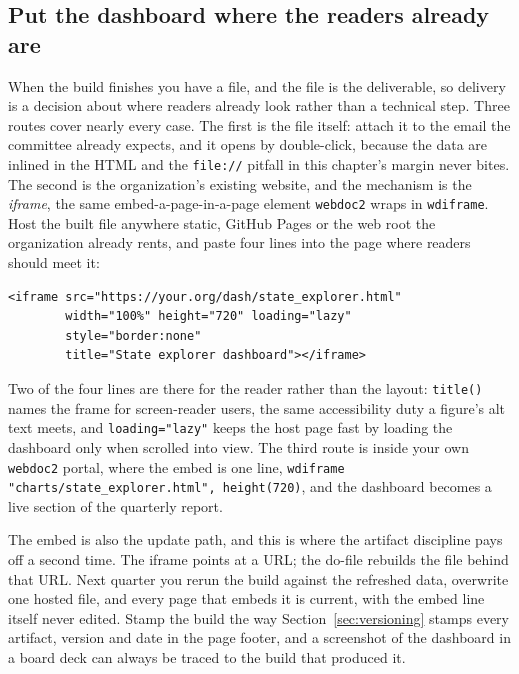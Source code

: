 \subsection{Put the dashboard where the readers already are}
When the build finishes you have a file, and the file is the deliverable, so delivery is a decision about where readers already look rather than a technical step. Three routes cover nearly every case. The first is the file itself: attach it to the email the committee already expects, and it opens by double-click, because the data are inlined in the HTML and the \texttt{file://} pitfall in this chapter's margin never bites. The second is the organization's existing website, and the mechanism is the \emph{iframe}, the same embed-a-page-in-a-page element \texttt{webdoc2} wraps in \texttt{wdiframe}. Host the built file anywhere static, GitHub Pages or the web root the organization already rents, and paste four lines into the page where readers should meet it:
\par
{\footnotesize
\begin{verbatim}
<iframe src="https://your.org/dash/state_explorer.html"
        width="100%" height="720" loading="lazy"
        style="border:none"
        title="State explorer dashboard"></iframe>
\end{verbatim}
}
Two of the four lines are there for the reader rather than the layout: \texttt{title()} names the frame for screen-reader users, the same accessibility duty a figure's alt text meets, and \texttt{loading="lazy"} keeps the host page fast by loading the dashboard only when scrolled into view. The third route is inside your own \texttt{webdoc2} portal, where the embed is one line, \texttt{wdiframe "charts/state\_explorer.html", height(720)}, and the dashboard becomes a live section of the quarterly report.

The embed is also the update path, and this is where the artifact discipline pays off a second time. The iframe points at a URL; the do-file rebuilds the file behind that URL. Next quarter you rerun the build against the refreshed data, overwrite one hosted file, and every page that embeds it is current, with the embed line itself never edited. Stamp the build the way Section~\ref{sec:versioning} stamps every artifact, version and date in the page footer, and a screenshot of the dashboard in a board deck can always be traced to the build that produced it.

